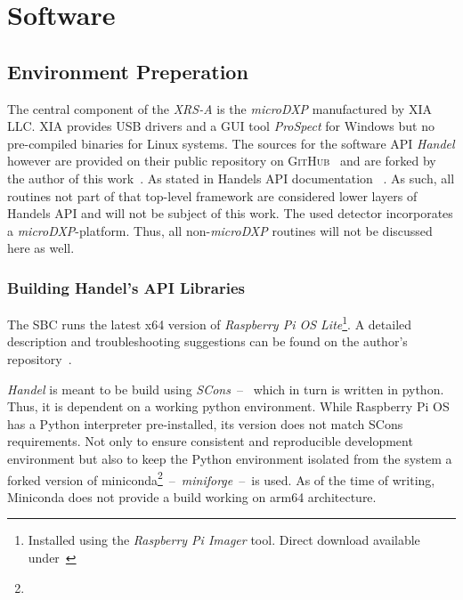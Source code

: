 \chapter{Software}
    \section{Environment Preperation}
        The central component of the \textit{XRS-A} is the \textit{microDXP} manufactured by \textsc{XIA LLC}.
        \textsc{XIA} provides USB drivers and a GUI tool \textit{ProSpect} for Windows but no pre-compiled binaries for Linux systems.
        The sources for the software API \textit{Handel} however are provided on their public repository on \textsc{GitHub}~\cite{Software.HandelRelease.2023} and are forked by the author of this work~\cite{Software.XraythesisHandel.2023}.
        As stated in Handels API documentation ~\cite{Manual.HandelAPIManual.Xiang}.
        As such, all routines not part of that top-level framework are considered lower layers of Handels API and will not be subject of this work.
        The used detector incorporates a \textit{microDXP}-platform.
        Thus, all non-\textit{microDXP} routines will not be discussed here as well.\par\medskip

        \subsection{Building Handel's API Libraries}\label{sec:building libraries}
            The SBC runs the latest x64 version of \textit{Raspberry Pi OS Lite}\footnote{Installed using the \textit{Raspberry Pi Imager} tool.
            Direct download available under~\cite{Software.RaspberryPiOSLite.2023}}.
            A detailed description and troubleshooting suggestions can be found on the author's repository~\cite{Software.XraythesisHandel.2023}.\par\medskip

            \textit{Handel} is meant to be build using \textit{SCons}~--~ which in turn is written in python.
            Thus, it is dependent on a working python environment.
            While Raspberry Pi OS has a Python interpreter pre-installed, its version does not match SCons requirements.
            Not only to ensure consistent and reproducible development environment but also to keep the Python environment isolated from the system a forked version of miniconda\footnote{}~--~\textit{miniforge}~--~is used.
            As of the time of writing, Miniconda does not provide a build working on arm64 architecture.

